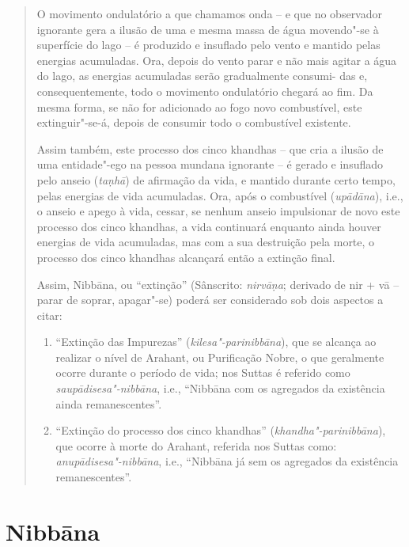 \begin{quote}
  O movimento ondulatório a que chamamos onda -- e que no observador ignorante
  gera a ilusão de uma e mesma massa de água movendo"-se à superfície do lago --
  é produzido e insuflado pelo vento e mantido pelas energias acumuladas. Ora,
  depois do vento parar e não mais agitar a água do lago, as energias acumuladas
  serão gradualmente consumi- das e, consequentemente, todo o movimento
  ondulatório chegará ao fim. Da mesma forma, se não for adicionado ao fogo novo
  combustível, este extinguir"-se-á, depois de consumir todo o combustível
  existente.

  Assim também, este processo dos cinco khandhas -- que cria a ilusão de uma
  entidade"-ego na pessoa mundana ignorante -- é gerado e insuflado pelo anseio
  (\emph{ta\d{n}hā}) de afirmação da vida, e mantido durante certo tempo, pelas energias de
  vida acumuladas. Ora, após o combustível (\emph{upādāna}), i.e., o anseio e
  apego à vida, cessar, se nenhum anseio impulsionar de novo este processo dos
  cinco khandhas, a vida continuará enquanto ainda houver energias de vida
  acumuladas, mas com a sua destruição pela morte, o processo dos cinco khandhas
  alcançará então a extinção final.

  Assim, Nibbāna, ou “extinção” (Sânscrito: \emph{nirvā\d{n}a}; derivado de nir +
  vā -- parar de soprar, apagar"-se) poderá ser considerado sob dois aspectos a
  citar:

  \begin{enumerate}

    \item “Extinção das Impurezas” (\emph{kilesa"-parinibbāna}), que se
          alcança ao realizar o nível de Arahant, ou Purificação Nobre, o que
          geralmente ocorre durante o período de vida; nos Suttas é referido
          como \emph{saupādisesa"-nibbāna}, i.e., “Nibbāna com os agregados da
          existência ainda remanescentes”.

    \item “Extinção do processo dos cinco khandhas”
          (\emph{khandha"-parinibbāna}), que ocorre à morte do Arahant, referida
          nos Suttas como: \emph{anupādisesa"-nibbāna}, i.e., “Nibbāna já sem os
          agregados da existência remanescentes”.

  \end{enumerate}
\end{quote}

\section{Nibbāna}

